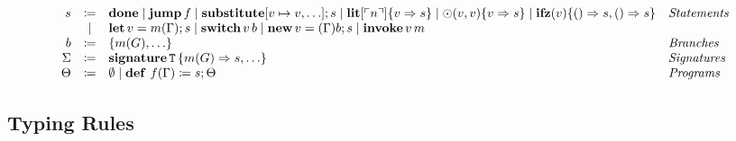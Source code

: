 
\begin{definition}
    \[ 
      \begin{array}{r c l l}
        s & \coloneqq & \mathbf{done}  \mid \mathbf{jump}\, f \mid \mathbf{substitute}[v \mapsto v,\ldots]; s \mid \mathbf{lit}[\ulcorner n \urcorner]\{ v \Rightarrow s \} \mid \odot(v, v)\{ v \Rightarrow s \} \mid \mathbf{ifz}(v)\{ () \Rightarrow s, () \Rightarrow s \} & \emph{Statements}\\
        & \mid & \mathbf{let}\, v = m(\Gamma); s \mid \mathbf{switch}\, v\, b \mid \mathbf{new}\, v = (\Gamma)b; s \mid \mathbf{invoke}\, v\, m & \\
        b & \coloneqq & \{ m(G), \ldots \} & \emph{Branches}\\
        \Sigma & \coloneqq & \mathbf{signature}\, \mathtt{T}\, \{ m(G) \Rightarrow s, \ldots \} & \emph{Signatures}\\
        \Theta & \coloneqq & \emptyset \mid \mathbf{def}\ f(\Gamma) \coloneq s; \Theta & \emph{Programs}\\
      \end{array}
    \]
\end{definition}

\subsection{Typing Rules}
\label{subsec:axcut:typing-rules}

